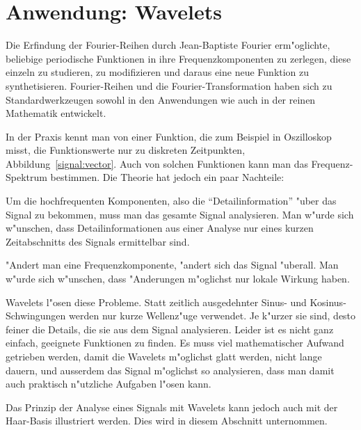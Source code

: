 %
%
%
\section{Anwendung: Wavelets\label{section-wavelets}}
Die Erfindung der Fourier-Reihen durch Jean-Baptiste Fourier erm"oglichte,
beliebige periodische Funktionen in ihre Frequenzkomponenten zu zerlegen,
diese einzeln zu studieren, zu modifizieren und daraus eine neue Funktion
zu synthetisieren. Fourier-Reihen und die Fourier-Transformation haben
sich zu Standardwerkzeugen sowohl in den Anwendungen wie auch in der
reinen Mathematik entwickelt.

In der Praxis kennt man von einer Funktion, die zum Beispiel in
Oszilloskop misst, die Funktionswerte nur zu diskreten Zeitpunkten,
Abbildung~\ref{signal:vector}.
Auch von solchen Funktionen kann man das Frequenz-Spektrum bestimmen.
Die Theorie hat jedoch ein paar Nachteile:
\begin{compactenum}
\item Um die hochfrequenten Komponenten, also die ``Detailinformation''
"uber das Signal zu bekommen, muss man das gesamte Signal analysieren.
Man w"urde sich w"unschen, dass Detailinformationen aus einer Analyse
nur eines kurzen Zeitabschnitts des Signals ermittelbar sind.
\item "Andert man eine Frequenzkomponente, "andert sich das Signal
"uberall. Man w"urde sich w"unschen, dass "Anderungen m"oglichst nur
lokale Wirkung haben.
\end{compactenum}
Wavelets l"osen diese Probleme. Statt zeitlich ausgedehnter Sinus-
und Kosinus-Schwingungen werden nur kurze Wellenz"uge verwendet.
Je k"urzer sie sind, desto feiner die Details, die sie aus dem 
Signal analysieren. Leider ist es nicht ganz einfach, geeignete
Funktionen zu finden. Es muss viel mathematischer Aufwand getrieben
werden, damit die Wavelets m"oglichst glatt werden, nicht lange
dauern, und ausserdem das Signal m"oglichst so analysieren, dass
man damit auch praktisch n"utzliche Aufgaben l"osen kann.

Das Prinzip der Analyse eines Signals mit Wavelets kann jedoch
auch mit der Haar-Basis illustriert werden. Dies wird in diesem
Abschnitt unternommen.

